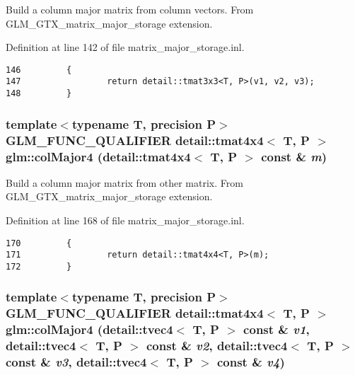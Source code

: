 Build a column major matrix from column vectors. From GLM\_\-GTX\_\-matrix\_\-major\_\-storage extension. 

Definition at line 142 of file matrix\_\-major\_\-storage.inl.

\begin{Code}\begin{verbatim}146         {
147                 return detail::tmat3x3<T, P>(v1, v2, v3);
148         }
\end{verbatim}
\end{Code}


\hypertarget{group__gtx__matrix__major__storage_g85020709c53f89466c5135114e85d34a}{
\subsubsection[colMajor4]{\setlength{\rightskip}{0pt plus 5cm}template$<$typename T, precision P$>$ GLM\_\-FUNC\_\-QUALIFIER detail::tmat4x4$<$ T, P $>$ glm::colMajor4 (detail::tmat4x4$<$ T, P $>$ const \& {\em m})}}
\label{group__gtx__matrix__major__storage_g85020709c53f89466c5135114e85d34a}


Build a column major matrix from other matrix. From GLM\_\-GTX\_\-matrix\_\-major\_\-storage extension. 

Definition at line 168 of file matrix\_\-major\_\-storage.inl.

\begin{Code}\begin{verbatim}170         {
171                 return detail::tmat4x4<T, P>(m);
172         }
\end{verbatim}
\end{Code}


\hypertarget{group__gtx__matrix__major__storage_g585113d3d54f337093700210a8103f6d}{
\subsubsection[colMajor4]{\setlength{\rightskip}{0pt plus 5cm}template$<$typename T, precision P$>$ GLM\_\-FUNC\_\-QUALIFIER detail::tmat4x4$<$ T, P $>$ glm::colMajor4 (detail::tvec4$<$ T, P $>$ const \& {\em v1}, \/  detail::tvec4$<$ T, P $>$ const \& {\em v2}, \/  detail::tvec4$<$ T, P $>$ const \& {\em v3}, \/  detail::tvec4$<$ T, P $>$ const \& {\em v4})}}
\label{group__gtx__matrix__major__storage_g585113d3d54f337093700210a8103f6d}


